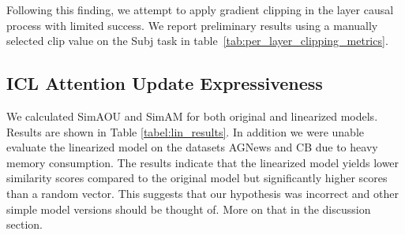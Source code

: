 

Following this finding, we attempt to apply gradient clipping in the layer causal process with limited success.
We report preliminary results using a manually selected clip value on the Subj task in table~\ref{tab:per_layer_clipping_metrics}.



\subsection{ICL Attention Update Expressiveness}
We calculated SimAOU and SimAM for both original and linearized models. Results are shown in Table \ref{tabel:lin_results}.
In addition we were unable evaluate the linearized model on the datasets AGNews and CB due to heavy memory consumption. 
The results indicate that the linearized model yields lower similarity scores compared to the original model but significantly higher scores than a random vector. This suggests that our hypothesis was incorrect and other simple model versions should be thought of. More on that in the discussion section.

